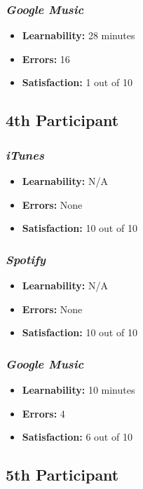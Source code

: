 \documentclass{article}
\begin{document}
\begin{multicols}{2}
\subsubsection{\it Google Music}
\begin{itemize}
\item {\bf Learnability:} 28 minutes
	\item {\bf Errors:} 16
	\item {\bf Satisfaction:} 1 out of 10 
\end{itemize}

\subsection{4th Participant}

\subsubsection{\it iTunes}
\begin{itemize}
	\item {\bf Learnability:} N/A
	\item {\bf Errors:}  None
	\item {\bf Satisfaction:} 10 out of 10 
\end{itemize}

\subsubsection{\it Spotify}
\begin{itemize}
	\item {\bf Learnability:} N/A
	\item {\bf Errors:} None
	\item {\bf Satisfaction:} 10 out of 10 
\end{itemize}

\subsubsection{\it Google Music}
\begin{itemize}
\item {\bf Learnability:} 10 minutes
	\item {\bf Errors:} 4
	\item {\bf Satisfaction:} 6 out of 10 
\end{itemize}

\subsection{5th Participant}


\end{multicols}
\end{document}
